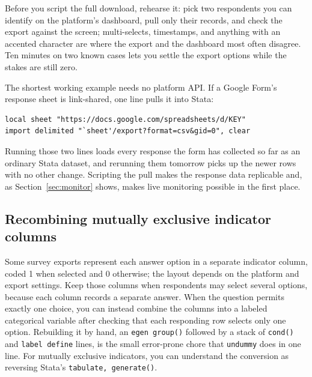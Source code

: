 Before you script the full download, rehearse it: pick two respondents you can identify on the platform's dashboard, pull only their records, and check the export against the screen; multi-selects, timestamps, and anything with an accented character are where the export and the dashboard most often disagree. Ten minutes on two known cases lets you settle the export options while the stakes are still zero.

The shortest working example needs no platform API. If a Google Form's response sheet is link-shared, one line pulls it into Stata:
\par
{\footnotesize
\begin{verbatim}
local sheet "https://docs.google.com/spreadsheets/d/KEY"
import delimited "`sheet'/export?format=csv&gid=0", clear
\end{verbatim}
}
Running those two lines loads every response the form has collected so far as an ordinary Stata dataset, and rerunning them tomorrow picks up the newer rows with no other change. Scripting the pull makes the response data replicable and, as Section~\ref{sec:monitor} shows, makes live monitoring possible in the first place.

\subsection{Recombining mutually exclusive indicator columns}
Some survey exports represent each answer option in a separate indicator column, coded 1 when selected and 0 otherwise; the layout depends on the platform and export settings. Keep those columns when respondents may select several options, because each column records a separate answer. When the question permits exactly one choice, you can instead combine the columns into a labeled categorical variable after checking that each responding row selects only one option. Rebuilding it by hand, an \texttt{egen group()} followed by a stack of \texttt{cond()} and \texttt{label define} lines, is the small error-prone chore that \texttt{undummy} does in one line. For mutually exclusive indicators, you can understand the conversion as reversing Stata's \texttt{tabulate, generate()}.

